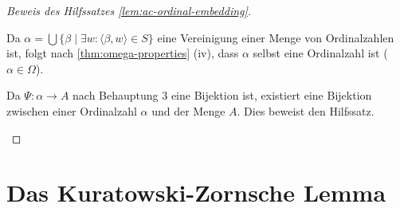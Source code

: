 \begin{proof}[Beweis des Hilfssatzes \ref{lem:ac-ordinal-embedding}]
\begin{math-stroke}

Da $\alpha = \bigcup \{ \beta \mid \exists w \colon \langle \beta, w \rangle \in S \}$ eine Vereinigung einer Menge von Ordinalzahlen ist, folgt nach \cref{thm:omega-properties} (iv), dass $\alpha$ selbst eine Ordinalzahl ist ($\alpha \in \Omega$).

Da $\Psi \colon \alpha \to A$ nach Behauptung 3 eine Bijektion ist, existiert eine Bijektion zwischen einer Ordinalzahl $\alpha$ und der Menge $A$. Dies beweist den Hilfssatz.
\end{math-stroke}
\end{proof}

\section{Das Kuratowski-Zornsche Lemma}

